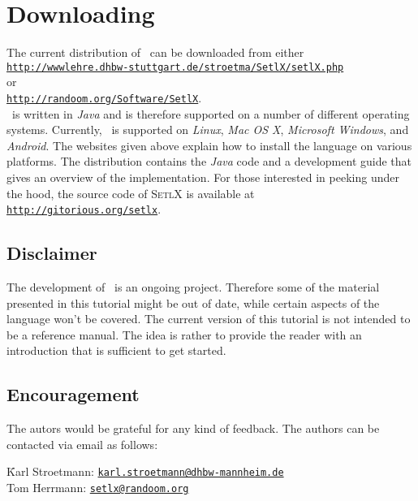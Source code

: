 \section*{Downloading}
The current distribution of  \setlx\ can be downloaded from either
\\[0.2cm]
\hspace*{1.3cm}
\href{http://wwwlehre.dhbw-stuttgart.de/~stroetma/SetlX/setlX.php}{\texttt{http://wwwlehre.dhbw-stuttgart.de/stroetma/SetlX/setlX.php}}
\\[0.2cm]
or
\\[0.2cm]
\hspace*{1.3cm}
\href{http://randoom.org/Software/SetlX}{\texttt{http://randoom.org/Software/SetlX}}.
\\[0.2cm]
\setlx\ is
written in \textsl{Java} and is therefore supported on a number of different operating
systems.  Currently, \setlx\ is supported on \textsl{Linux}, \textsl{Mac OS X},
\textsl{Microsoft Windows}, and \textsl{Android}.  
The websites given above explain how to install the language on various platforms.  
The distribution contains the \textsl{Java} code and a development guide that gives an
overview of the implementation. For those
interested in peeking under the hood, the source code of \textsc{SetlX}
is available at
\\[0.2cm]
\hspace*{1.3cm}
\href{http://gitorious.org/setlx}{\texttt{http://gitorious.org/setlx}}.



\subsection*{Disclaimer}
The development of \setlx\ is an ongoing project.  Therefore some of the material presented in
this tutorial might be out of date, while certain aspects of the language won't be
covered.  The current version of this tutorial is not intended to be a reference manual.
The idea is rather to provide the reader with an introduction that is sufficient to get started.

\subsection*{Encouragement}
The autors would be grateful for any kind of feedback.  The authors can be contacted via
email as follows:
\begin{tabbing}
\qquad \= Karl Stroetmann: \qquad \= \href{mailto:karl.stroetmann@dhbw-mannheim.de}{\texttt{karl.stroetmann@dhbw-mannheim.de}} \\[0.2cm]
       \> Tom Herrmann:           \> \href{mailto:setlx@randoom.org}{\texttt{setlx@randoom.org}}
\end{tabbing}

